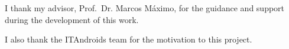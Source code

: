 \color{red}
I thank my advisor, Prof.~Dr. Marcos Máximo, for the guidance and support during the development of this work.

I also thank the ITAndroids team for the motivation to this project.
